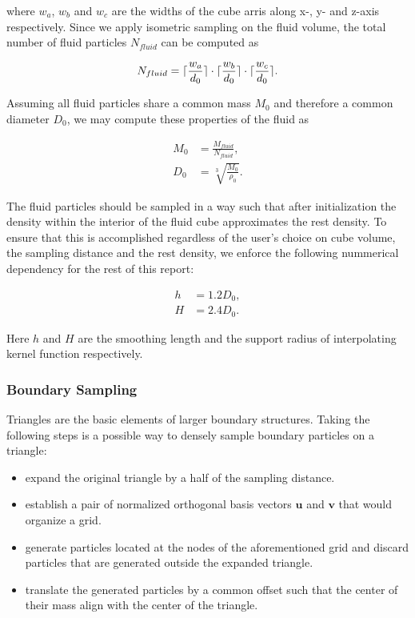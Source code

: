 \documentclass[
	11pt, 
	DIV10,
	ngerman,
	a4paper, 
	oneside, 
	headings=normal, 
	captions=tableheading,
	final, 
	numbers=noenddot
]{scrartcl}
\DeclarePairedDelimiter{\ceil}{\lceil}{\rceil}
\begin{document}
where $ w_{a} $, $ w_{b} $ and $ w_{c} $ are the widths of the cube arris along x-, y- and z-axis respectively. Since we apply isometric sampling on the fluid volume, the total number of fluid particles $ N_{fluid} $ can be computed as

\begin{equation}
	\label{eq2}
	N_{fluid} = \ceil{\frac{w_{a}}{d_{0}}} \cdot \ceil{\frac{w_{b}}{d_{0}}} \cdot \ceil{\frac{w_{c}}{d_{0}}}.
\end{equation}

Assuming all fluid particles share a common mass $ M_{0} $ and therefore a common diameter $ D_{0} $, we may compute these properties of the fluid as

\begin{equation}
\begin{split}
	\label{eq3}
	M_{0} &= \frac{M_{fluid}}{N_{fluid}}, \\[1em]
	D_{0} &= \sqrt[3]{\frac{M_{0}}{\rho_{0}}}.
\end{split}
\end{equation}

The fluid particles should be sampled in a way such that after initialization the density within the interior of the fluid cube approximates the rest density. To ensure that this is accomplished regardless of the user's choice on cube volume, the sampling distance and the rest density, we enforce the following nummerical dependency for the rest of this report:

\begin{equation}
\begin{split}
	\label{eq4}
	h &= 1.2D_{0}, \\[1em]
	H &= 2.4D_{0}.
\end{split}
\end{equation}

Here $ h $ and $ H $ are the smoothing length and the support radius of interpolating kernel function respectively.

\subsubsection{Boundary Sampling}

Triangles are the basic elements of larger boundary structures. Taking the following steps is a possible way to densely sample boundary particles on a triangle:

\begin{itemize}
    \item expand the original triangle by a half of the sampling distance.
    \item establish a pair of normalized orthogonal basis vectors $ \boldsymbol{u} $ and $ \boldsymbol{v} $ that would organize a grid.
    \item generate particles located at the nodes of the aforementioned grid and discard particles that are generated outside the expanded triangle.
    \item translate the generated particles by a common offset such that the center of their mass align with the center of the triangle.
\end{itemize}
\end{document}
